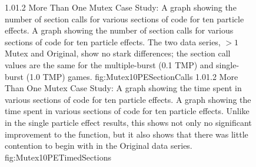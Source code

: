 \begin{figure}
\addtocounter{figure}{-1}
	\vspace{-1.5cm}
	{1.0}{1.2}
	{More Than One Mutex Case Study: A graph showing the number of section calls for various sections of code for ten particle effects.}
	{A graph showing the number of section calls for various sections of code for ten particle effects. The two data series, $ > 1 $ Mutex and Original, show no stark differences; the section call values are the same for the multiple-burst (0.1 TMP) and single-burst (1.0 TMP) games.}
	{fig:Mutex10PESectionCalls}
	\vspace{-1.5cm}
	{1.0}{1.2}
	{More Than One Mutex Case Study: A graph showing the time spent in various sections of code for ten particle effects.}
	{A graph showing the time spent in various sections of code for ten particle effects. Unlike in the single particle effect results, this shows not only no significant improvement to the  function, but it also shows that there was little contention to begin with in the Original data series.}
	{fig:Mutex10PETimedSections}

\end{figure}


